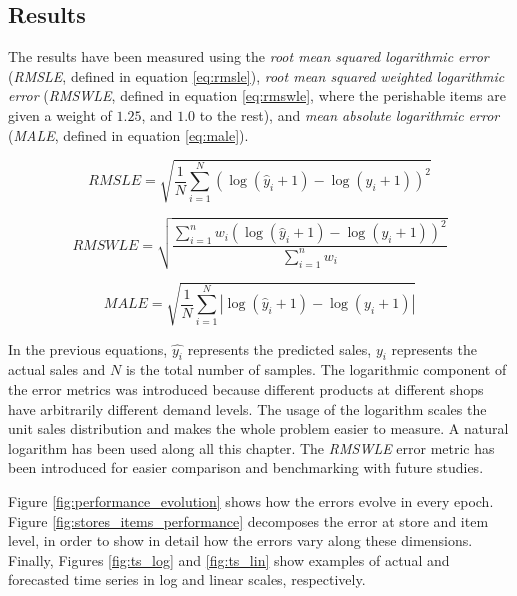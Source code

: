 \subsection{Results} \label{sec:salesforecast-results}

The results have been measured using the \textit{root mean squared logarithmic error} (\textit{RMSLE}, defined in equation \ref{eq:rmsle}), \textit{root mean squared weighted logarithmic error} (\textit{RMSWLE}, defined in equation \ref{eq:rmswle}, where the perishable items are given a weight of $1.25$, and $1.0$ to the rest),  and \textit{mean absolute logarithmic error} (\textit{MALE}, defined in equation \ref{eq:male}).

\begin{equation} \label{eq:rmsle}
RMSLE = \sqrt{ \frac{1}{N} \displaystyle\sum_{i=1}^N  \left(\log(\hat{y}_i + 1) - \log(y_i +1)  \right)^2  }
\end{equation}

\begin{equation} \label{eq:rmswle}
RMSWLE = \sqrt{ \frac{\displaystyle\sum_{i=1}^n w_i \left( \log(\hat{y}_i + 1) - \log(y_i +1)  \right)^2  }{\displaystyle\sum_{i=1}^n w_i}}
\end{equation}

\begin{equation} \label{eq:male}
MALE = \sqrt{ \frac{1}{N} \displaystyle\sum_{i=1}^N  \left|\log(\hat{y}_i + 1) - \log(y_i +1)  \right|  }
\end{equation}


In the previous equations, $\hat{y_i}$ represents the predicted sales,  $y_i$ represents the actual sales and $N$ is the total number of samples. The logarithmic component of the error metrics was introduced because different products at different shops have arbitrarily different demand levels. The usage of the logarithm scales the unit sales distribution and makes the whole problem easier to measure. A natural logarithm has been used along all this chapter. The \textit{RMSWLE} error metric has been introduced for easier comparison and benchmarking with future studies.

Figure \ref{fig:performance_evolution} shows how the errors evolve in every epoch. Figure \ref{fig:stores_items_performance} decomposes the error at store and item level, in order to show in detail how the errors vary along these dimensions. Finally, Figures \ref{fig:ts_log} and \ref{fig:ts_lin} show examples of actual and forecasted time series in log and linear scales, respectively.

